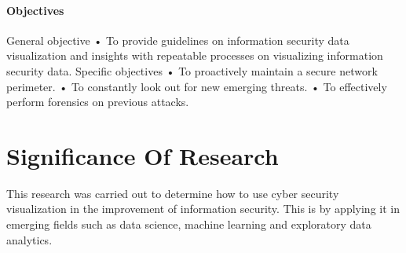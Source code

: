\documentclass[12pt]{report}
\begin{document}
\paragraph{Objectives}
General objective
•	To provide guidelines on information security data visualization and insights with repeatable processes on visualizing information security data.
Specific objectives
•	To proactively maintain a secure network perimeter.
•	To constantly look out for new emerging threats.
•	To effectively perform forensics on previous attacks.

\section{Significance Of Research}
This research was carried out to determine how to use cyber security visualization in the improvement of information security. This is by applying it in emerging fields such as data science, machine learning and exploratory data analytics.
\end{document}
